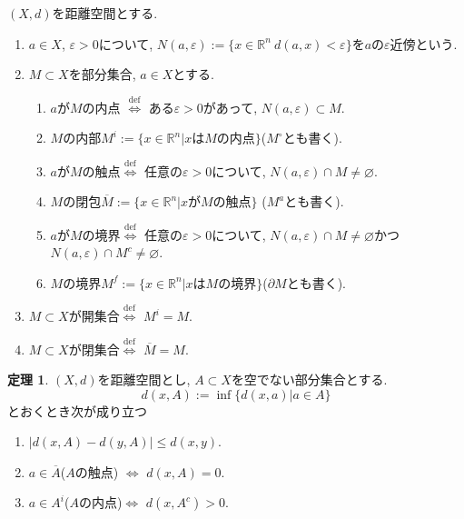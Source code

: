 \documentclass[dvipdfmx,a4paper,11pt]{article}
\newcommand{\R}{\mathbb{R}}
\theoremstyle{definition}
\newtheorem{thm}{定理}
\begin{document}
 \begin{tcolorbox}[
    colback = white,
    colframe = black!35!black,
    fonttitle = \bfseries,
    breakable = true]
$(X,d)$を距離空間とする. 
    \begin{enumerate}
    \setlength{\parskip}{0cm} 
  \setlength{\itemsep}{0cm} 
\item $a \in X$, $\varepsilon >0$について, $N(a, \varepsilon):= \{ x \in \R^n \ d(a, x) < \varepsilon\}$を$a$の$\varepsilon$近傍という.
\item $M \subset X$を部分集合, $a \in X$とする.
    \begin{enumerate}[label=(\arabic*).]
    \setlength{\parskip}{0cm} 
  \setlength{\itemsep}{0cm} 
  \item $a$が$M$の内点 $\stackrel{\mathrm{def}}{\Longleftrightarrow}$ ある$\varepsilon >0$があって, $N(a, \varepsilon)\subset M$.
  \item $M$の内部$M^i := \{ x \in \R^n| \text{$x$は$M$の内点}\}$($M^{\circ}$とも書く).
  \item $a$が$M$の触点$\stackrel{\mathrm{def}}{\Longleftrightarrow}$ 任意の$\varepsilon >0$について, $N(a, \varepsilon) \cap M \neq \varnothing$.
    \item $M$の閉包$\overline{M} := \{ x \in \R^n| \text{$x$が$M$の触点}\}$ ($M^a$とも書く).
   \item $a$が$M$の境界$\stackrel{\mathrm{def}}{\Longleftrightarrow}$ 任意の$\varepsilon >0$について, $N(a, \varepsilon) \cap M \neq \varnothing$かつ$N(a, \varepsilon) \cap M^c \neq \varnothing$.
    \item $M$の境界$M^f := \{ x \in \R^n| \text{$x$は$M$の境界}\}$($\partial M$とも書く).
  \end{enumerate}
  \item $M \subset X$が開集合$\stackrel{\mathrm{def}}{\Longleftrightarrow}$ $M^i =M$.
  \item $M \subset X$が閉集合$\stackrel{\mathrm{def}}{\Longleftrightarrow}$ $\overline{M} =M$.
   \end{enumerate}
 \end{tcolorbox}
 
 
\begin{tcolorbox}[
    colback = white,
    colframe = black!35!black,
    fonttitle = \bfseries,
    breakable = true]
    \begin{thm}
    $(X, d)$を距離空間とし, $A \subset X$を空でない部分集合とする.
    $$
    d(x, A):= \inf \{ d(x, a) | a \in A\}  
    $$
    とおくとき次が成り立つ
    \begin{enumerate}[label=(\arabic*).]
    \setlength{\parskip}{0cm} 
  \setlength{\itemsep}{0cm} 
  \item $|d(x, A) - d(y, A)| \le d(x, y)$.
  \item $a \in \overline{A}$($A$の触点) $\Longleftrightarrow$ $d(x, A)=0$. 
    \item $a \in A^i$($A$の内点)$\Longleftrightarrow$ $d(x, A^c)>0$. 
\end{enumerate}
\end{thm}
 \end{tcolorbox}
 
\end{document}
